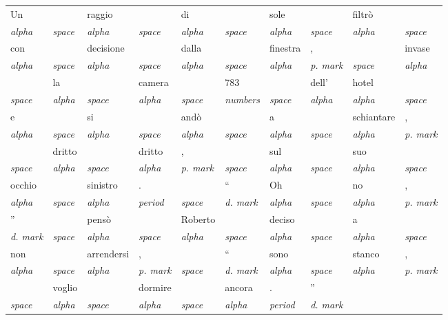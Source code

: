 \documentclass[twoside,stylearticle,11pt,filologia,it,article,bibsection]{spinoza}
\begin{document}
{\begin{scriptsize}
\begin{tabular}[h]{|*{10}{l|}}
\hline
Un& &raggio& &di& &sole& &filtrò& \\
{\it alpha}&{\it space}&{\it alpha}&{\it space}&{\it alpha}&{\it space}&{\it alpha}&{\it space}&{\it alpha}&{\it space}\\
\hline
con& &decisione& &dalla& &finestra&,& &invase\\
{\it alpha}&{\it space}&{\it alpha}&{\it space}&{\it alpha}&{\it space}&{\it alpha}&{\it p. mark}&{\it space}&{\it alpha}\\
\hline
 &la& &camera& &783& &dell’&hotel& \\
{\it space}&{\it alpha}&{\it space}&{\it alpha}&{\it space}&{\it numbers}&{\it space}&{\it alpha}&{\it alpha}&{\it space}\\
\hline
e& &si& &andò& &a& &schiantare&,\\
{\it alpha}&{\it space}&{\it alpha}&{\it space}&{\it alpha}&{\it space}&{\it alpha}&{\it space}&{\it alpha}&{\it p. mark}\\
\hline
 &dritto& &dritto&,& &sul& &suo& \\
{\it space}&{\it alpha}&{\it space}&{\it alpha}&{\it p. mark}&{\it space}&{\it alpha}&{\it space}&{\it alpha}&{\it space}\\
\hline
occhio& &sinistro&.& &“&Oh& &no&,\\
{\it alpha}&{\it space}&{\it alpha}&{\it period}&{\it space}&{\it d. mark}&{\it alpha}&{\it space}&{\it alpha}&{\it p. mark}\\
\hline
”& &pensò& &Roberto& &deciso& &a& \\
{\it d. mark}&{\it space}&{\it alpha}&{\it space}&{\it alpha}&{\it space}&{\it alpha}&{\it space}&{\it alpha}&{\it space}\\
\hline
non& &arrendersi&,& &“&sono& &stanco&,\\
{\it alpha}&{\it space}&{\it alpha}&{\it p. mark}&{\it space}&{\it d. mark}&{\it alpha}&{\it space}&{\it alpha}&{\it p. mark}\\
\hline
 &voglio& &dormire& &ancora&.&”\\
{\it space}&{\it alpha}&{\it space}&{\it alpha}&{\it space}&{\it alpha}&{\it period}&{\it d. mark}\\
\hline
\end{tabular}
\end{scriptsize}
}

\afterpage{\clearpage}
\end{document}

